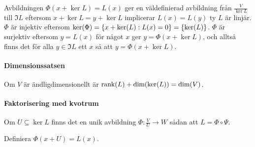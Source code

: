 \proof
Avbildningen $\Phi(x + \ker{L}) = L(x)$ ger en väldefinierad avbildning från $\frac{V}{\ker{L}}$ till $\Im{L}$ eftersom $x + \ker{L} = y + \ker{L}$ implicerar $L(x) = L(y)$ ty $L$ är linjär. $\Phi$ är injektiv eftersom $\ker{\Phi} = \set{x + \ker{L}}{L(x) = 0} = \set{\ker{L}}{}$. $\Phi$ är surjektiv eftersom $y = L(x)$ för något $x$ ger $y = \Phi(x + \ker{L})$, och alltså finns det för alla $y\in\Im{L}$ ett $x$ så att $y = \Phi(x + \ker{L})$.

\paragraph{Dimensionssatsen}
Om $V$ är ändligdimensionellt är $\text{rank}(L) + \text{dim}(\text{ker}(L)) = \text{dim}(V)$.

\proof

\paragraph{Faktorisering med kvotrum}
Om $U\subseteq\ker{L}$ finns det en unik avbildning $\Phi: \frac{V}{U}\to W$ sådan att $L = \Phi\circ\Psi$.

\proof
Definiera $\Phi(x + U) = L(x)$.